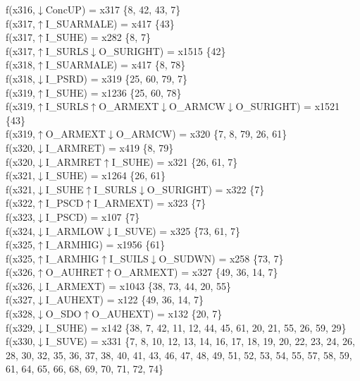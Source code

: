 f(x316,$\downarrow$ConcUP) = x317 \{8, 42, 43, 7\} \\  
f(x317,$\uparrow$I\_SUARMALE) = x417 \{43\} \\  
f(x317,$\uparrow$I\_SUHE) = x282 \{8, 7\} \\  
f(x317,$\uparrow$I\_SURLS$\downarrow$O\_SURIGHT) = x1515 \{42\} \\  
f(x318,$\uparrow$I\_SUARMALE) = x417 \{8, 78\} \\  
f(x318,$\downarrow$I\_PSRD) = x319 \{25, 60, 79, 7\} \\  
f(x319,$\uparrow$I\_SUHE) = x1236 \{25, 60, 78\} \\  
f(x319,$\uparrow$I\_SURLS$\uparrow$O\_ARMEXT$\downarrow$O\_ARMCW$\downarrow$O\_SURIGHT) = x1521 \{43\} \\  
f(x319,$\uparrow$O\_ARMEXT$\downarrow$O\_ARMCW) = x320 \{7, 8, 79, 26, 61\} \\  
f(x320,$\downarrow$I\_ARMRET) = x419 \{8, 79\} \\  
f(x320,$\downarrow$I\_ARMRET$\uparrow$I\_SUHE) = x321 \{26, 61, 7\} \\  
f(x321,$\downarrow$I\_SUHE) = x1264 \{26, 61\} \\  
f(x321,$\downarrow$I\_SUHE$\uparrow$I\_SURLS$\downarrow$O\_SURIGHT) = x322 \{7\} \\  
f(x322,$\uparrow$I\_PSCD$\uparrow$I\_ARMEXT) = x323 \{7\} \\  
f(x323,$\downarrow$I\_PSCD) = x107 \{7\} \\  
f(x324,$\downarrow$I\_ARMLOW$\downarrow$I\_SUVE) = x325 \{73, 61, 7\} \\  
f(x325,$\uparrow$I\_ARMHIG) = x1956 \{61\} \\  
f(x325,$\uparrow$I\_ARMHIG$\uparrow$I\_SUILS$\downarrow$O\_SUDWN) = x258 \{73, 7\} \\  
f(x326,$\uparrow$O\_AUHRET$\uparrow$O\_ARMEXT) = x327 \{49, 36, 14, 7\} \\  
f(x326,$\downarrow$I\_ARMEXT) = x1043 \{38, 73, 44, 20, 55\} \\  
f(x327,$\downarrow$I\_AUHEXT) = x122 \{49, 36, 14, 7\} \\  
f(x328,$\downarrow$O\_SDO$\uparrow$O\_AUHEXT) = x132 \{20, 7\} \\  
f(x329,$\downarrow$I\_SUHE) = x142 \{38, 7, 42, 11, 12, 44, 45, 61, 20, 21, 55, 26, 59, 29\} \\  
f(x330,$\downarrow$I\_SUVE) = x331 \{7, 8, 10, 12, 13, 14, 16, 17, 18, 19, 20, 22, 23, 24, 26, 28, 30, 32, 35, 36, 37, 38, 40, 41, 43, 46, 47, 48, 49, 51, 52, 53, 54, 55, 57, 58, 59, 61, 64, 65, 66, 68, 69, 70, 71, 72, 74\} \\  
